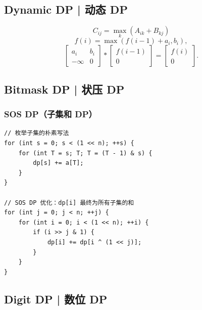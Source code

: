 \subsection{Dynamic DP | 动态 DP}

    \[
        C_{ij} = \max_k (A_{ik} + B_{kj})
    \]
    \[
        f(i) = \max(f(i-1) + a_i, b_i),
    \]
    \[
        \begin{bmatrix} a_i & b_i \\ -\infty & 0 \end{bmatrix}
        \ast
        \begin{bmatrix} f(i-1) \\ 0 \end{bmatrix}
        =
        \begin{bmatrix} f(i) \\ 0 \end{bmatrix}.
    \]

\subsection{Bitmask DP | 状压 DP}

    \subsubsection{SOS DP（子集和 DP）}

        \begin{lstlisting}
// 枚举子集的朴素写法
for (int s = 0; s < (1 << n); ++s) {
    for (int T = s; T; T = (T - 1) & s) {
        dp[s] += a[T];
    }
}

// SOS DP 优化：dp[i] 最终为所有子集的和
for (int j = 0; j < n; ++j) {
    for (int i = 0; i < (1 << n); ++i) {
        if (i >> j & 1) {
            dp[i] += dp[i ^ (1 << j)];
        }
    }
}
        \end{lstlisting}

\subsection{Digit DP | 数位 DP}


